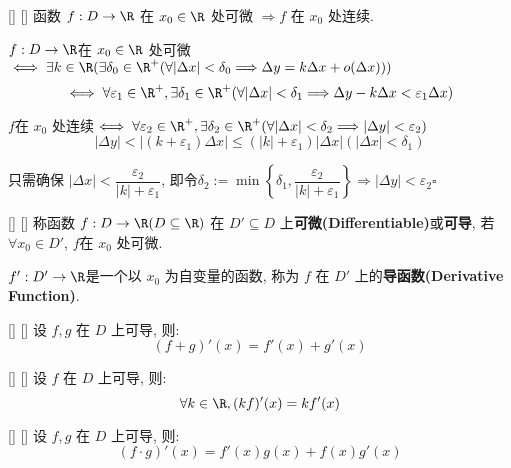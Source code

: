 \documentclass[UTF8]{ctexart}
\begin{document}
			\begin{ppt}
			    []
			    {}
			    []
			    []
				函数 \(f:D\to\R\) 在 \(x_0\in\R\) 处可微 \(\Longrightarrow f\) 在 \(x_0\) 处连续. 
			\end{ppt}

            \begin{prf} 

				\(f:D\to\R\)在 \(x_0\in\R\) 处可微\(\iff\exists k\in\R(\exists\delta_0\in\R^+(\forall|\Delta x|<\delta_0\Longrightarrow\Delta y=k\Delta x+o(\Delta x)))\)
				\[\iff\forall\varepsilon_1\in\R^+,\exists\delta_1\in\R^+(\forall|\Delta x|<\delta_1\Longrightarrow\Delta y-k\Delta x<\varepsilon_1\Delta x)\]
				
				\(f\)在 \(x_0\) 处连续\(\iff\forall\varepsilon_2\in\R^+,\exists\delta_2\in\R^+(\forall|\Delta x|<\delta_2\Longrightarrow|\Delta y|<\varepsilon_2)\)
				\[|\Delta y|<|(k+\varepsilon_1)\Delta x|\leq(|k|+\varepsilon_1)|\Delta x|(|\Delta x|<\delta_1)\]

				只需确保 \(|\Delta x|<\dfrac{\varepsilon_2}{|k|+\varepsilon_1}\), 即令\(\delta_2:=\min\left\{\delta_1,\dfrac{\varepsilon_2}{|k|+\varepsilon_1}\right\}\Longrightarrow|\Delta y|<\varepsilon_2\square\)
            \end{prf}
			
			\begin{dfn}
			    []
			    {}
			    []
			    []
				称函数 \(f:D\to\R(D\subseteq\R)\) 在 \(D'\subseteq D\) 上\textbf{可微(Differentiable)}或\textbf{可导}, 若 \(\forall x_0\in D'\), \(f\)在 \(x_0\) 处可微. 
				
				\(f':D'\to\R\)是一个以 \(x_0\) 为自变量的函数, 称为 \(f\) 在 \(D'\) 上的\textbf{导函数(Derivative Function)}. 
			\end{dfn}
				
			\begin{ppt}
			    []
			    {}
			    []
			    []
				设 \(f,g\) 在 \(D\) 上可导, 则: 
				\[(f+g)'(x)=f'(x)+g'(x)\]
			\end{ppt}
			
			\begin{ppt}
			    []
			    {}
			    []
			    []
				设 \(f\) 在 \(D\) 上可导, 则: 
				\[\forall k\in\R, (kf)'(x)=kf'(x)\]
			\end{ppt}
			
			\begin{ppt}
			    []
			    {}
			    []
			    []
				设 \(f,g\) 在 \(D\) 上可导, 则: 
				\[(f\cdot g)'(x)=f'(x)g(x)+f(x)g'(x)\]
			\end{ppt}
			
\end{document}
